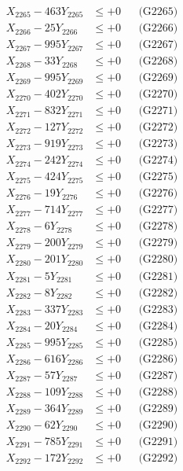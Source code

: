 \documentclass[a4paper,10pt]{article}
\begin{document}
{\begin{align}
X_{2265} - 463Y_{2265} &\leq +0 && \text{(G2265)} \\
X_{2266} - 25Y_{2266} &\leq +0 && \text{(G2266)} \\
X_{2267} - 995Y_{2267} &\leq +0 && \text{(G2267)} \\
X_{2268} - 33Y_{2268} &\leq +0 && \text{(G2268)} \\
X_{2269} - 995Y_{2269} &\leq +0 && \text{(G2269)} \\
X_{2270} - 402Y_{2270} &\leq +0 && \text{(G2270)} \\
\allowbreak
X_{2271} - 832Y_{2271} &\leq +0 && \text{(G2271)} \\
X_{2272} - 127Y_{2272} &\leq +0 && \text{(G2272)} \\
X_{2273} - 919Y_{2273} &\leq +0 && \text{(G2273)} \\
X_{2274} - 242Y_{2274} &\leq +0 && \text{(G2274)} \\
X_{2275} - 424Y_{2275} &\leq +0 && \text{(G2275)} \\
X_{2276} - 19Y_{2276} &\leq +0 && \text{(G2276)} \\
X_{2277} - 714Y_{2277} &\leq +0 && \text{(G2277)} \\
X_{2278} - 6Y_{2278} &\leq +0 && \text{(G2278)} \\
X_{2279} - 200Y_{2279} &\leq +0 && \text{(G2279)} \\
X_{2280} - 201Y_{2280} &\leq +0 && \text{(G2280)} \\
\allowbreak
X_{2281} - 5Y_{2281} &\leq +0 && \text{(G2281)} \\
X_{2282} - 8Y_{2282} &\leq +0 && \text{(G2282)} \\
X_{2283} - 337Y_{2283} &\leq +0 && \text{(G2283)} \\
X_{2284} - 20Y_{2284} &\leq +0 && \text{(G2284)} \\
X_{2285} - 995Y_{2285} &\leq +0 && \text{(G2285)} \\
X_{2286} - 616Y_{2286} &\leq +0 && \text{(G2286)} \\
X_{2287} - 57Y_{2287} &\leq +0 && \text{(G2287)} \\
X_{2288} - 109Y_{2288} &\leq +0 && \text{(G2288)} \\
X_{2289} - 364Y_{2289} &\leq +0 && \text{(G2289)} \\
X_{2290} - 62Y_{2290} &\leq +0 && \text{(G2290)} \\
\allowbreak
X_{2291} - 785Y_{2291} &\leq +0 && \text{(G2291)} \\
X_{2292} - 172Y_{2292} &\leq +0 && \text{(G2292)} \\

\end{align}}
\end{document}
